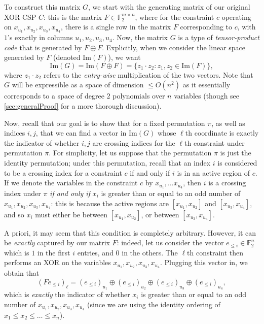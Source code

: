 \documentclass[11pt]{article}
\theoremstyle{definition}
\newcommand{\F}{\mathbb{F}}
\begin{document}
To construct this matrix $G$, we start with the generating matrix of our original XOR CSP $C$: this is the matrix $F \in \F_2^{m \times n}$, where for the constraint $c$ operating on $x_{u_1}, x_{u_2}, x_{u_3}, x_{u_4}$, there is a single row in the matrix $F$ corresponding to $c$, with $1$'s exactly in columns $u_1, u_2, u_3, u_4$. Now, the matrix $G$ is a type of \emph{tensor-product code} that is generated by $F \oplus F$. Explicitly, when we consider the linear space generated by $F$ (denoted $\mathrm{Im}(F)$), we want
\[
\mathrm{Im}(G) = \mathrm{Im}(F \oplus F) = \{ z_1 \cdot z_2: z_1, z_2 \in \mathrm{Im}(F) \},
\]
where $z_1 \cdot z_2$ refers to the \emph{entry-wise} multiplication of the two vectors. Note that $G$ will be expressible as a space of dimension $\leq O(n^2)$ as it essentially corresponds to a space of degree $2$ polynomials over $n$ variables (though see \cref{sec:generalProof} for a more thorough discussion). 

Now, recall that our goal is to show that for a fixed permutation $\pi$, as well as indices $i, j$, that we can find a vector in $\mathrm{Im}(G)$ whose $\ell$th coordinate is exactly the indicator of whether $i,j$ are crossing indices for the $\ell$th constraint under permutation $\pi$. For simplicity, let us suppose that the permutation $\pi$ is just the identity permutation; under this permutation, recall that an index $i$ is considered to be a crossing index for a constraint $c$ if and only if $i$ is in an active region of $c$. If we denote the variables in the constraint $c$ by $x_{u_1}, \dots x_{u_4}$, then $i$ is a crossing index under $\pi$ \emph{if and only if} $x_i$ is greater than or equal to an odd number of $x_{u_1}, x_{u_2}, x_{u_3}, x_{u_4}$: this is because the active regions are $[x_{u_1}, x_{u_2}]$ and $[x_{u_3}, x_{u_4}]$, and so $x_i$ must either be between $[x_{u_1}, x_{u_2}]$, or between $[x_{u_3}, x_{u_4}]$.

A priori, it may seem that this condition is completely arbitrary. However, it can be \emph{exactly} captured by our matrix $F$: indeed, let us consider the vector $e_{\leq i} \in \F_2^n$ which is $1$ in the first $i$ entries, and $0$ in the others. The $\ell$th constraint then performs an XOR on the variables $x_{u_1}, x_{u_2}, x_{u_3}, x_{u_4}$. Plugging this vector in, we obtain that
\[
(F e_{\leq i})_{\ell} = (e_{\leq i})_{u_1} \oplus (e_{\leq i})_{u_2} \oplus (e_{\leq i})_{u_3} \oplus (e_{\leq i})_{u_4},
\]
which is \emph{exactly} the indicator of whether $x_i$ is greater than or equal to an odd number of $x_{u_1}, x_{u_2}, x_{u_3}, x_{u_4}$ (since we are using the identity ordering of $x_1 \leq x_2 \leq \dots \leq x_n$).
\end{document}
